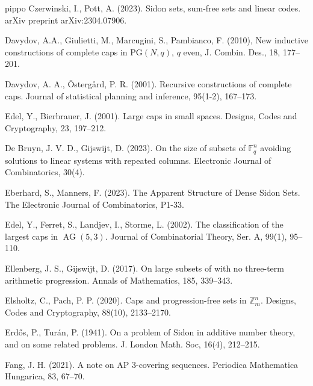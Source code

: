 \documentclass[11pt]{article}
\numberwithin{table}{section}
\theoremstyle{definition}
\DeclareMathOperator{\PG}{{PG}}
\DeclareMathOperator{\AG}{{AG}}
\begin{document}
{\begin{thebibliography}{pippo}
			 Czerwinski, I.,  Pott, A. (2023). Sidon sets, sum-free sets and linear codes. arXiv preprint arXiv:2304.07906.
			
			 Davydov, A.A., Giulietti, M., Marcugini, S., Pambianco, F. (2010), New inductive constructions of complete caps in $\mathrm{PG}(N,q)$, $q$ even, J. Combin. Des., 18, 177--201.
			
			
			
			 Davydov, A. A.,  \"Osterg\aa rd, P. R. (2001). Recursive constructions of complete caps. Journal of statistical planning and inference, 95(1-2), 167--173. 
			
			Edel, Y.,  Bierbrauer, J. (2001). Large caps in small spaces. Designs, Codes and Cryptography, 23, 197--212.
			
			 De Bruyn, J. V. D.,  Gijswijt, D. (2023). On the size of subsets of $\mathbb {F} _q^n $ avoiding solutions to linear systems with repeated columns.  Electronic Journal of Combinatorics, 30(4).
			
			 Eberhard, S.,  Manners, F. (2023). The Apparent Structure of Dense Sidon Sets. The Electronic Journal of Combinatorics, P1-33.
			
			Edel, Y., Ferret, S., Landjev, I.,  Storme, L. (2002). The classification of the largest caps in $\AG(5, 3)$. Journal of Combinatorial Theory, Ser. A, 99(1), 95--110.
			
			Ellenberg, J. S.,  Gijswijt, D. (2017). On large subsets of with no three-term arithmetic progression. Annals of Mathematics, 185, 339--343.
			
			Elsholtz, C.,  Pach, P. P. (2020). Caps and progression-free sets in $\mathbb{Z}_m^n$. Designs, Codes and Cryptography, 88(10), 2133--2170.
			
			 Erd\H os, P.,  Turán, P. (1941). On a problem of Sidon in additive number theory, and on some related problems. J. London Math. Soc, 16(4), 212--215.
			
			 Fang, J. H. (2021). A note on AP 3-covering sequences. Periodica Mathematica Hungarica, 83, 67--70.
			

\end{thebibliography}}
\end{document}
